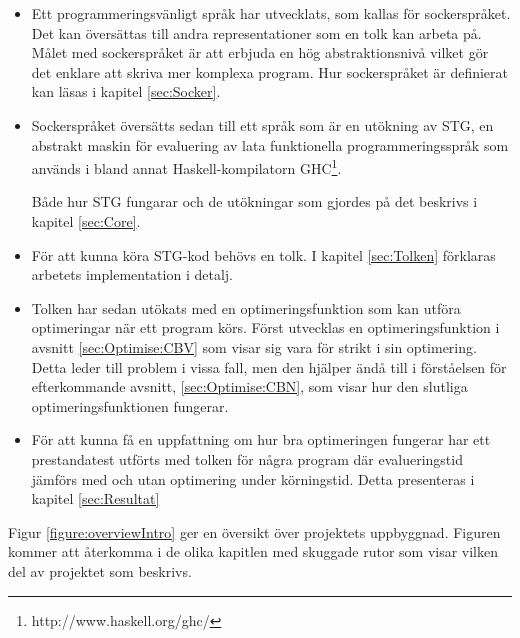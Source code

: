 \documentclass[Rapport]{subfiles}
\begin{document}
\begin{itemize}
    \item Ett programmeringsvänligt språk har
          utvecklats, som kallas för sockerspråket. Det 
          kan översättas till andra representationer som en tolk kan arbeta på. Målet med sockerspråket är att erbjuda en hög abstraktionsnivå vilket gör det enklare att skriva mer komplexa program.
Hur sockerspråket är definierat
          kan läsas i kapitel \ref{sec:Socker}.
          
    \item Sockerspråket översätts sedan till ett språk som är en utökning 
          av STG, en abstrakt maskin för evaluering av
          lata funktionella programmeringsspråk \cite{stg} som används i bland annat
          Haskell-kompilatorn GHC\footnote{http://www.haskell.org/ghc/}. 

          Både hur STG fungarar och de utökningar som gjordes på det beskrivs
          i kapitel \ref{sec:Core}.
    
    \item För att kunna köra STG-kod behövs en tolk. 
          I kapitel \ref{sec:Tolken} förklaras arbetets implementation i detalj.
    
    \item Tolken har sedan utökats med en optimeringsfunktion som kan utföra optimeringar
          när ett program körs. Först utvecklas en optimeringsfunktion i avsnitt 
          \ref{sec:Optimise:CBV} som visar sig vara för strikt i sin optimering.
          Detta leder till problem i vissa fall, men den hjälper ändå till
          i förståelsen för efterkommande avsnitt, \ref{sec:Optimise:CBN}, som visar hur
          den slutliga optimeringsfunktionen fungerar.
    
    \item För att kunna få en uppfattning om hur bra optimeringen fungerar har
          ett prestandatest utförts med tolken för några program där 
          evalueringstid jämförs med och utan optimering under körningstid. 
          Detta presenteras i kapitel \ref{sec:Resultat}
    
\end{itemize}

Figur \ref{figure:overviewIntro} ger en översikt över projektets uppbyggnad. Figuren kommer
att återkomma i de olika kapitlen med skuggade rutor som visar 
vilken del av projektet som beskrivs.
\end{document}
